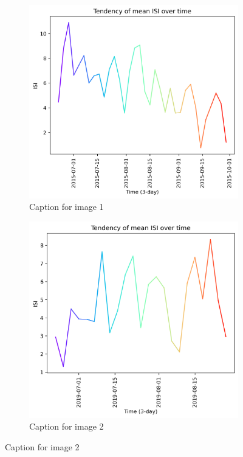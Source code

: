 \begin{figure}[h]
	\caption{HELLo}
	\centering
	\begin{subfigure}{0.49\textwidth}
		\centering
		\includegraphics[width=\textwidth]{graphs/2015/tendency/2015_tendency_graph_ISI.png}
		\caption{Caption for image 1}
		\label{fig:img1}
	\end{subfigure}
	\hfill
	\begin{subfigure}{0.49\textwidth}
		\centering
		\includegraphics[width=\textwidth]{graphs/2019/tendency/2019_tendency_graph_ISI.png}
		\caption{Caption for image 2}
		\label{fig:img2}
	\end{subfigure}
	\label{fig:both_images}
\end{figure}


